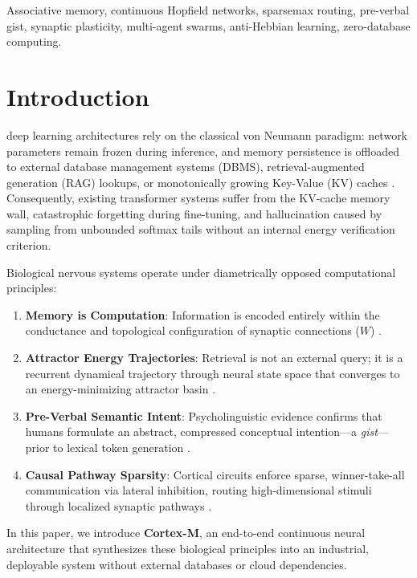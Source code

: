 \documentclass[journal]{IEEEtran}
\begin{document}
\begin{IEEEkeywords}
Associative memory, continuous Hopfield networks, sparsemax routing, pre-verbal gist, synaptic plasticity, multi-agent swarms, anti-Hebbian learning, zero-database computing.
\end{IEEEkeywords}

\section{Introduction}
 deep learning architectures rely on the classical von Neumann paradigm: network parameters remain frozen during inference, and memory persistence is offloaded to external database management systems (DBMS), retrieval-augmented generation (RAG) lookups, or monotonically growing Key-Value (KV) caches \cite{vaswani2017attention, lewis2020retrieval}. Consequently, existing transformer systems suffer from the KV-cache memory wall, catastrophic forgetting during fine-tuning, and hallucination caused by sampling from unbounded softmax tails without an internal energy verification criterion.

Biological nervous systems operate under diametrically opposed computational principles:
\begin{enumerate}
    \item \textbf{Memory is Computation}: Information is encoded entirely within the conductance and topological configuration of synaptic connections ($W$) \cite{hebb1949organization, markram1997regulation}.
    \item \textbf{Attractor Energy Trajectories}: Retrieval is not an external query; it is a recurrent dynamical trajectory through neural state space that converges to an energy-minimizing attractor basin \cite{hopfield1982neural, krotov2016dense}.
    \item \textbf{Pre-Verbal Semantic Intent}: Psycholinguistic evidence confirms that humans formulate an abstract, compressed conceptual intention---a \textit{gist}---prior to lexical token generation \cite{levelt1989speaking}.
    \item \textbf{Causal Pathway Sparsity}: Cortical circuits enforce sparse, winner-take-all communication via lateral inhibition, routing high-dimensional stimuli through localized synaptic pathways \cite{martins2016softmax}.
\end{enumerate}

In this paper, we introduce \textbf{Cortex-M}, an end-to-end continuous neural architecture that synthesizes these biological principles into an industrial, deployable system without external databases or cloud dependencies.
\end{document}
